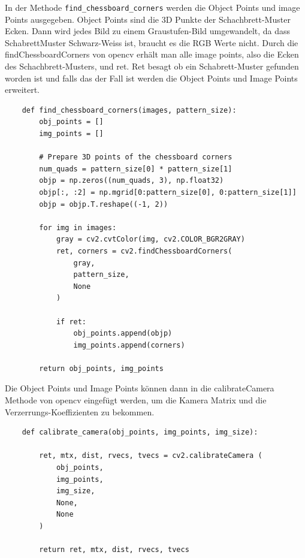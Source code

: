 In der Methode \texttt{find\_chessboard\_corners} werden die Object Points und image Points ausgegeben. Object Points sind die 3D Punkte der Schachbrett-Muster Ecken.
Dann wird jedes Bild zu einem Graustufen-Bild umgewandelt, da dass SchabrettMuster Schwarz-Weiss ist, braucht es die RGB Werte nicht. 
Durch die findChessboardCorners von opencv erhält man alle image points, also die Ecken des Schachbrett-Musters, und ret. 
Ret besagt ob ein Schabrett-Muster gefunden worden ist und falls das der Fall ist werden die Object Points und Image Points erweitert. \clearpage



\begin{lstlisting}
    def find_chessboard_corners(images, pattern_size):
        obj_points = []
        img_points = []

        # Prepare 3D points of the chessboard corners
        num_quads = pattern_size[0] * pattern_size[1]
        objp = np.zeros((num_quads, 3), np.float32)
        objp[:, :2] = np.mgrid[0:pattern_size[0], 0:pattern_size[1]]
        objp = objp.T.reshape((-1, 2))

        for img in images:
            gray = cv2.cvtColor(img, cv2.COLOR_BGR2GRAY)
            ret, corners = cv2.findChessboardCorners(
                gray,
                pattern_size, 
                None
            )

            if ret:
                obj_points.append(objp)
                img_points.append(corners)

        return obj_points, img_points
\end{lstlisting}

Die Object Points und Image Points können dann in die calibrateCamera Methode von opencv eingefügt 
werden, um die Kamera Matrix und die Verzerrungs-Koeffizienten zu bekommen.



\begin{lstlisting}
    def calibrate_camera(obj_points, img_points, img_size):

        ret, mtx, dist, rvecs, tvecs = cv2.calibrateCamera (
            obj_points, 
            img_points, 
            img_size, 
            None, 
            None
        )

        return ret, mtx, dist, rvecs, tvecs
\end{lstlisting}


